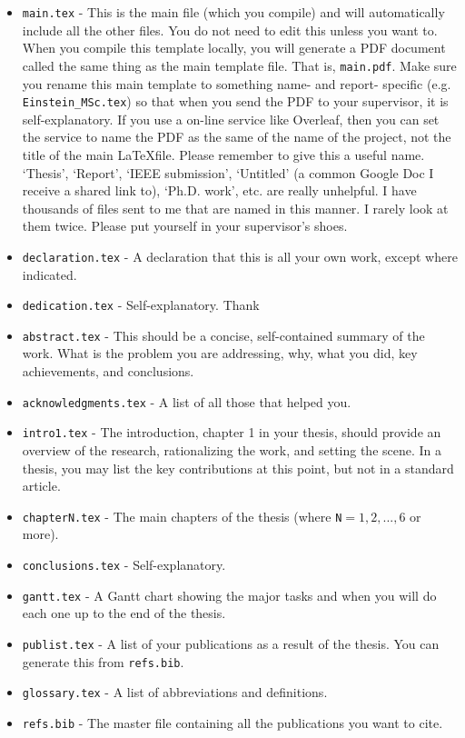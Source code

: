 \begin{itemize}
\item \verb|main.tex| - This is the main file (which you compile) and will automatically include all the other files. You do not need to edit this unless you want to. 
When you compile this template locally, you will generate a PDF document called the same
thing as the main template file. That is, \verb|main.pdf|. 
Make sure you rename this main template to something name- and report- specific 
(e.g. \verb|Einstein_MSc.tex|) so that when you send the PDF to your supervisor, 
it is self-explanatory. If you use a on-line service like Overleaf, then you can set the service to name the PDF as the same of the name of the project, not the title of the main \LaTeX file. Please remember to give this a useful name. `Thesis', `Report', `IEEE submission', `Untitled' (a common Google Doc I receive a shared link to), `Ph.D. work', etc. are really unhelpful. I have thousands of files sent to me that are named in this manner. I rarely look at them twice. Please put yourself in your supervisor's shoes. 
\item \verb|declaration.tex| - A declaration that this is all your own work, except where indicated.
\item \verb|dedication.tex| - Self-explanatory. Thank 
\item \verb|abstract.tex| - This should be a concise, self-contained summary of the work.
What is the problem you are addressing, why, what you did, key achievements, and conclusions.
\item \verb|acknowledgments.tex| - A list of all those that helped you. 
\item \verb|intro1.tex| - The introduction, chapter 1 in your thesis, should provide an overview of the research, rationalizing the work, and setting the scene. In a thesis, you may list the key contributions at this point, but not in a standard article. 
\item \verb|chapterN.tex| - The main chapters of the thesis (where \verb|N|$=1,2,...,6$ or more). 
\item \verb|conclusions.tex| - Self-explanatory. 
\item \verb|gantt.tex| - A Gantt chart showing the major tasks and when you will do each one up to the end of the thesis.  
\item \verb|publist.tex| - A list of your publications as a result of the thesis. You can generate this from \verb|refs.bib|.
\item \verb|glossary.tex| - A list of abbreviations and definitions.
\item \verb|refs.bib| - The master file containing all the publications you want to cite.
\end{itemize}

